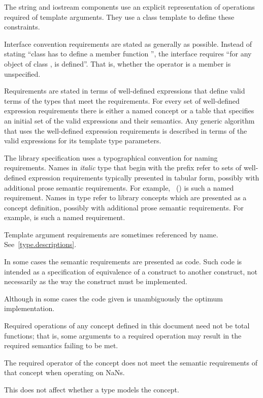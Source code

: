 \pnum
The string and iostream components use an explicit representation of operations
required of template arguments. They use a class template  to
define these constraints.

\pnum
Interface convention requirements are stated as generally as possible. Instead
of stating ``class  has to define a member function '', the
interface requires ``for any object  of class ,  is
defined''. That is, whether the operator is a member is unspecified.

\pnum
Requirements are stated in terms of well-defined expressions that define valid terms of
the types that meet the requirements. For every set of well-defined expression
requirements there is either a named concept or a table that specifies an initial set of the valid expressions and
their semantics. Any generic algorithm that uses the
well-defined expression requirements is described in terms of the valid expressions for
its template type parameters.

\pnum
The library specification uses a typographical convention for naming
requirements. Names in \textit{italic} type that begin with the prefix
\oldconcept{} refer to sets of well-defined expression requirements typically
presented in tabular form, possibly with additional prose semantic requirements.
For example, ~() is such a named
requirement. Names in  type refer to library concepts
which are presented as a concept definition, possibly with additional
prose semantic requirements. For example,
is such a named requirement.

\pnum
Template argument requirements are sometimes referenced by name.
See~\ref{type.descriptions}.

\pnum
In some cases the semantic requirements are presented as \Cpp{} code.
Such code is intended as a
specification of equivalence of a construct to another construct, not
necessarily as the way the construct
must be implemented.
\begin{footnote}
Although in some cases the code given is
unambiguously the optimum implementation.
\end{footnote}

\pnum
Required operations of any concept defined in this document need not be
total functions; that is, some arguments to a required operation may
result in the required semantics failing to be met.
\begin{example}
The required \tcode{<} operator of the 
concept does not meet the
semantic requirements of that concept when operating on NaNs.
\end{example}
This does not affect whether a type models the concept.

